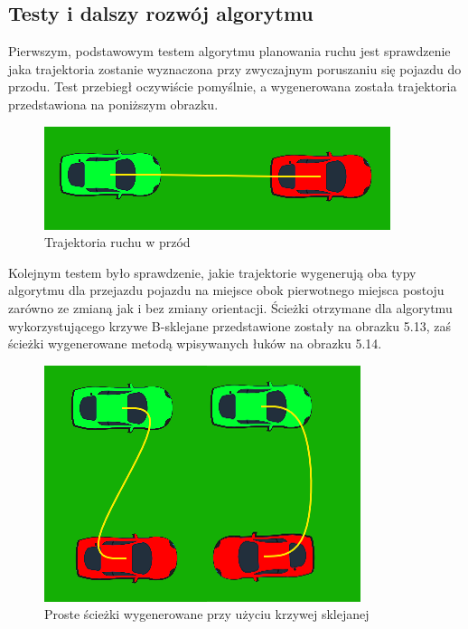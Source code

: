 \documentclass[a4paper,11pt,twoside]{report}
\theoremstyle{definition}
\begin{document}
\subsection{Testy i dalszy rozwój algorytmu}

Pierwszym, podstawowym testem algorytmu planowania ruchu jest sprawdzenie jaka trajektoria zostanie wyznaczona przy zwyczajnym poruszaniu się pojazdu do przodu. Test przebiegł oczywiście pomyślnie, a wygenerowana została trajektoria przedstawiona na poniższym obrazku.

\begin{figure}[h!]
\centering
\includegraphics[scale=0.9]{simplePath0}
\caption[Trajektoria ruchu w przód]{Trajektoria ruchu w przód}
\end{figure}

Kolejnym testem było sprawdzenie, jakie trajektorie wygenerują oba typy algorytmu dla przejazdu pojazdu na miejsce obok pierwotnego miejsca postoju zarówno ze zmianą jak i bez zmiany orientacji. Ścieżki otrzymane dla algorytmu wykorzystującego krzywe B-sklejane przedstawione zostały na obrazku 5.13, zaś ścieżki wygenerowane metodą wpisywanych łuków na obrazku 5.14.

\begin{figure}[h!]
\centering
\includegraphics[scale=0.9]{simplePath1}
\caption[Proste ścieżki wygenerowane przy użyciu krzywej sklejanej]{Proste ścieżki wygenerowane przy użyciu krzywej sklejanej}
\end{figure}
\end{document}
